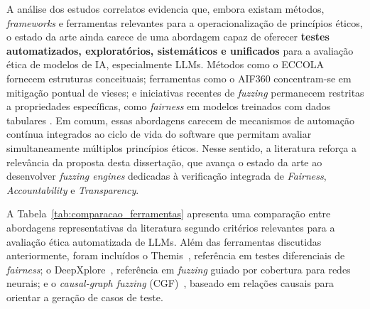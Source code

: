 A análise dos estudos correlatos evidencia que, embora existam métodos, \textit{frameworks} e ferramentas relevantes para a operacionalização de princípios éticos, o estado da arte ainda carece de uma abordagem capaz de oferecer \textbf{testes automatizados, exploratórios, sistemáticos e unificados} para a avaliação ética de modelos de IA, especialmente LLMs. Métodos como o ECCOLA fornecem estruturas conceituais; ferramentas como o AIF360 concentram-se em mitigação pontual de vieses; e iniciativas recentes de \textit{fuzzing} permanecem restritas a propriedades específicas, como \textit{fairness} em modelos treinados com dados tabulares \cite{Monjezi2024}. Em comum, essas abordagens carecem de mecanismos de automação contínua integrados ao ciclo de vida do software que permitam avaliar simultaneamente múltiplos princípios éticos. Nesse sentido, a literatura reforça a relevância da proposta desta dissertação, que avança o estado da arte ao desenvolver \textit{fuzzing engines} dedicadas à verificação integrada de \textit{Fairness}, \textit{Accountability} e \textit{Transparency}.

A Tabela~\ref{tab:comparacao_ferramentas} apresenta uma comparação entre abordagens representativas da literatura segundo critérios relevantes para a avaliação ética automatizada de LLMs. Além das ferramentas discutidas anteriormente, foram incluídos o Themis~\cite{Galhotra2017}, referência em testes diferenciais de \textit{fairness}; o DeepXplore~\cite{Pei2017}, referência em \textit{fuzzing} guiado por cobertura para redes neurais; e o \textit{causal-graph fuzzing} (CGF)~\cite{Monjezi2024}, baseado em relações causais para orientar a geração de casos de teste.

